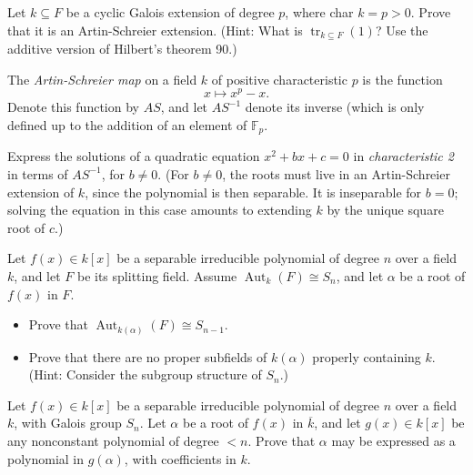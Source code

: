 \documentclass[openany]{book}
\begin{document}
\begin{prob}
Let \( k \subseteq F \) be a cyclic Galois extension of degree \( p \), where char \( k = p > 0 \).  
Prove that it is an Artin-Schreier extension. (Hint: What is \( \operatorname{tr}_{k \subseteq F}(1) \)? Use the additive version of Hilbert's theorem 90.)
\end{prob}

\begin{prob}
The \emph{Artin-Schreier map} on a field \( k \) of positive characteristic \( p \) is the function  
\[x \mapsto x^p - x.\]  
Denote this function by \( \mathit{AS} \), and let \( \mathit{AS}^{-1} \) denote its inverse (which is only defined up to the addition of an element of \( \mathbb{F}_p \).

Express the solutions of a quadratic equation \( x^2 + bx + c = 0 \) in \emph{characteristic 2} in terms of \( \mathit{AS}^{-1} \), for \( b \neq 0 \). (For \( b \neq 0 \), the roots must live in an Artin-Schreier extension of \( k \), since the polynomial is then separable. It is inseparable for \( b = 0 \); solving the equation in this case amounts to extending \( k \) by the unique square root of \( c \).)
\end{prob}

\begin{prob}
Let \( f(x) \in k[x] \) be a separable irreducible polynomial of degree \( n \) over a field \( k \), and let \( F \) be its splitting field. Assume \( \operatorname{Aut}_{k}(F) \cong S_n \), and let \( \alpha \) be a root of \( f(x) \) in \( F \).  

\begin{itemize}
    \item Prove that \( \operatorname{Aut}_{k(\alpha)}(F) \cong S_{n-1} \).  
    \item Prove that there are no proper subfields of \( k(\alpha) \) properly containing \( k \). (Hint: Consider the subgroup structure of \( S_n \).)
\end{itemize}
\end{prob}

\begin{prob}
Let \( f(x) \in k[x] \) be a separable irreducible polynomial of degree \( n \) over a field \( k \), with Galois group \( S_n \). Let \( \alpha \) be a root of \( f(x) \) in \( \overline{k} \), and let \( g(x) \in k[x] \) be any nonconstant polynomial of degree \( < n \). Prove that \( \alpha \) may be expressed as a polynomial in \( g(\alpha) \), with coefficients in \( k \).
\end{prob}
\end{document}
